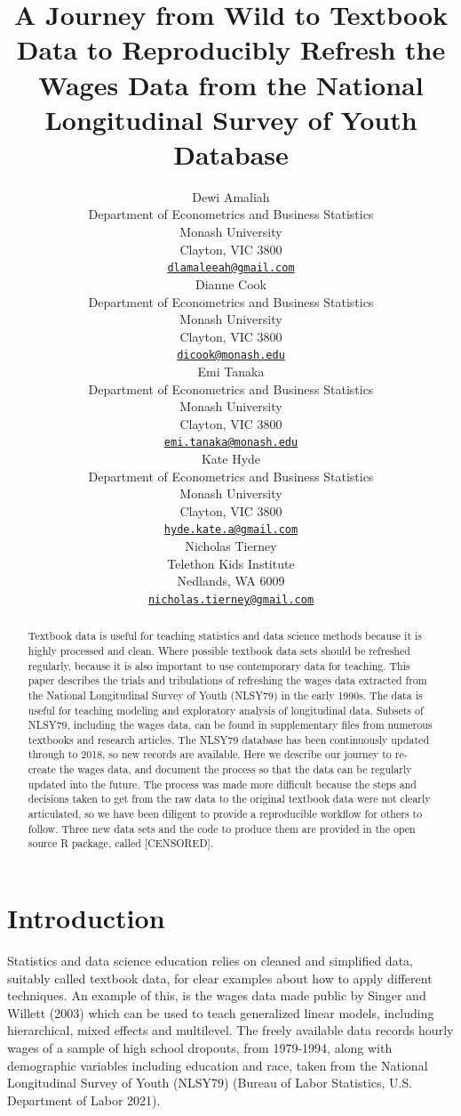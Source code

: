 \documentclass{article}
\title{A Journey from Wild to Textbook Data to Reproducibly Refresh the Wages Data from the National Longitudinal Survey of Youth Database}
\author{
    Dewi Amaliah
   \\
    Department of Econometrics and Business Statistics \\
    Monash University \\
  Clayton, VIC 3800 \\
  \texttt{\href{mailto:dlamaleeah@gmail.com}{\nolinkurl{dlamaleeah@gmail.com}}} \\
   \And
    Dianne Cook
   \\
    Department of Econometrics and Business Statistics \\
    Monash University \\
  Clayton, VIC 3800 \\
  \texttt{\href{mailto:dicook@monash.edu}{\nolinkurl{dicook@monash.edu}}} \\
   \And
    Emi Tanaka
   \\
    Department of Econometrics and Business Statistics \\
    Monash University \\
  Clayton, VIC 3800 \\
  \texttt{\href{mailto:emi.tanaka@monash.edu}{\nolinkurl{emi.tanaka@monash.edu}}} \\
   \And
    Kate Hyde
   \\
    Department of Econometrics and Business Statistics \\
    Monash University \\
  Clayton, VIC 3800 \\
  \texttt{\href{mailto:hyde.kate.a@gmail.com}{\nolinkurl{hyde.kate.a@gmail.com}}} \\
   \And
    Nicholas Tierney
   \\
    Telethon Kids Institute \\
  Nedlands, WA 6009 \\
  \texttt{\href{mailto:nicholas.tierney@gmail.com}{\nolinkurl{nicholas.tierney@gmail.com}}} \\
  }
\begin{document}
\maketitle


\begin{abstract}
Textbook data is useful for teaching statistics and data science methods because it is highly processed and clean. Where possible textbook data sets should be refreshed regularly, because it is also important to use contemporary data for teaching. This paper describes the trials and tribulations of refreshing the wages data extracted from the National Longitudinal Survey of Youth (NLSY79) in the early 1990s. The data is useful for teaching modeling and exploratory analysis of longitudinal data. Subsets of NLSY79, including the wages data, can be found in supplementary files from numerous textbooks and research articles. The NLSY79 database has been continuously updated through to 2018, so new records are available. Here we describe our journey to re-create the wages data, and document the process so that the data can be regularly updated into the future. The process was made more difficult because the steps and decisions taken to get from the raw data to the original textbook data were not clearly articulated, so we have been diligent to provide a reproducible workflow for others to follow. Three new data sets and the code to produce them are provided in the open source R package, called {[}CENSORED{]}.
\end{abstract}


\hypertarget{intro}{%
\section{Introduction}\label{intro}}

Statistics and data science education relies on cleaned and simplified data, suitably called textbook data, for clear examples about how to apply different techniques. An example of this, is the wages data made public by Singer and Willett (2003) which can be used to teach generalized linear models, including hierarchical, mixed effects and multilevel. The freely available data records hourly wages of a sample of high school dropouts, from 1979-1994, along with demographic variables including education and race, taken from the National Longitudinal Survey of Youth (NLSY79) (Bureau of Labor Statistics, U.S. Department of Labor 2021).
\end{document}
